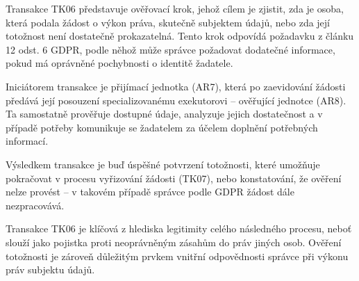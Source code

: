 \begin{itemize}
  Transakce TK06 představuje ověřovací krok, jehož cílem je zjistit, zda je osoba, která podala žádost o výkon práva, skutečně subjektem údajů, nebo zda její totožnost není dostatečně prokazatelná. Tento krok odpovídá požadavku z článku 12 odst. 6 GDPR, podle něhož může správce požadovat dodatečné informace, pokud má oprávněné pochybnosti o identitě žadatele.

  Iniciátorem transakce je přijímací jednotka (AR7), která po zaevidování žádosti předává její posouzení specializovanému exekutorovi – ověřující jednotce (AR8). Ta samostatně prověřuje dostupné údaje, analyzuje jejich dostatečnost a v případě potřeby komunikuje se žadatelem za účelem doplnění potřebných informací.

  Výsledkem transakce je buď úspěšné potvrzení totožnosti, které umožňuje pokračovat v procesu vyřizování žádosti (TK07), nebo konstatování, že ověření nelze provést – v takovém případě správce podle GDPR žádost dále nezpracovává.

  Transakce TK06 je klíčová z hlediska legitimity celého následného procesu, neboť slouží jako pojistka proti neoprávněným zásahům do práv jiných osob. Ověření totožnosti je zároveň důležitým prvkem vnitřní odpovědnosti správce při výkonu práv subjektu údajů.


\end{itemize}
